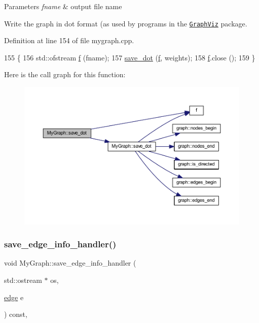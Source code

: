 \begin{DoxyParams}{Parameters}
{\em fname} & output file name\\
\hline
\end{DoxyParams}
Write the graph in dot format (as used by programs in the \href{http://www.research.att.com/sw/tools/graphviz/}{\tt Graph\+Viz} package. 

Definition at line 154 of file mygraph.\+cpp.


\begin{DoxyCode}
155 \{
156     std::ofstream \mbox{\hyperlink{rings_8cpp_a77369fc4d5326a16d2c603e032023528}{f}} (fname);
157     \mbox{\hyperlink{class_my_graph_acf68ca166eebb43a80b722c6ef15d22c}{save\_dot}} (\mbox{\hyperlink{rings_8cpp_a77369fc4d5326a16d2c603e032023528}{f}}, weights);
158     \mbox{\hyperlink{rings_8cpp_a77369fc4d5326a16d2c603e032023528}{f}}.close ();
159 \}
\end{DoxyCode}
Here is the call graph for this function\+:
\nopagebreak
\begin{figure}[H]
\begin{center}
\leavevmode
\includegraphics[width=350pt]{class_my_graph_a646cfd85f487b7f7b8fd9f074bd595ca_cgraph}
\end{center}
\end{figure}
\mbox{\label{class_my_graph_aa2c8ff76d5443d4788ecfebc8f799182}} 
\subsubsection{\texorpdfstring{save\+\_\+edge\+\_\+info\+\_\+handler()}{save\_edge\_info\_handler()}}
{\footnotesize\ttfamily void My\+Graph\+::save\+\_\+edge\+\_\+info\+\_\+handler (\begin{DoxyParamCaption}\item[{std\+::ostream $\ast$}]{os,  }\item[{\mbox{\hyperlink{classedge}{edge}}}]{e }\end{DoxyParamCaption}) const\hspace{0.3cm}{\ttfamily [virtual]}, {\ttfamily [inherited]}}

